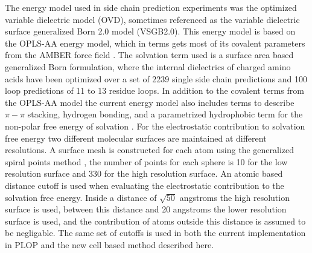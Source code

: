 The energy model used in side chain prediction experiments was the optimized variable dielectric model (OVD), sometimes referenced as the variable dielectric surface generalized Born 2.0 model (VSGB2.0).
This energy model is based on the OPLS-AA energy model, which in terms gets most of its covalent parameters from the AMBER force field \cite{jorgensen1996development}.
The solvation term used is a surface area based generalized Born formulation, where the internal dielectrics of charged amino acids have been optimized over a set of 2239 single side chain predictions and 100 loop predictions of 11 to 13 residue loops.
In addition to the covalent terms from the OPLS-AA model the current energy model also includes terms to describe $\pi-\pi$ stacking, hydrogen bonding, and a parametrized hydrophobic term for the non-polar free energy of solvation \cite{li2011vsgb}.
For the electrostatic contribution to solvation free energy two different molecular surfaces are maintained at different resolutions.
A surface mesh is constructed for each atom using the generalized spiral points method \cite{rakhmanov1994minimal,saff1997distributing,zhou1995arrangements}, the number of points for each sphere is 10 for the low resolution surface and 330 for the high resolution surface.
An atomic based distance cutoff is used when evaluating the electrostatic contribution to the solvation free energy.
Inside a distance of $\sqrt{50}$ angstroms the high resolution surface is used, between this distance and 20 angstroms the lower resolution surface is used, and the contribution of atoms outside this distance is assumed to be negligable.
The same set of cutoffs is used in both the current implementation in PLOP and the new cell based method described here.
